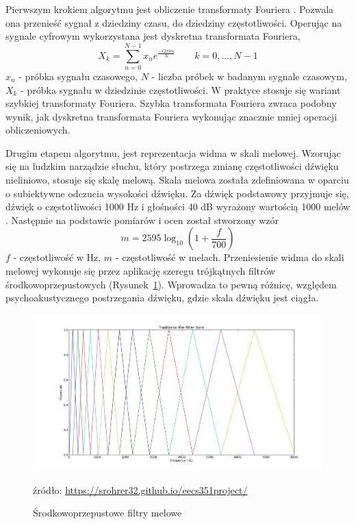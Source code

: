 \documentclass[a4paper,12pt,twoside,openany]{report}
\newcommand{\Rys}[1]{(Rysunek~\ref{#1})}
\newcommand{\zrodlo}[1]{\captionsetup{font=scriptsize}\caption*{źródło: \url{#1}}}
\begin{document}
Pierwszym krokiem algorytmu jest obliczenie transformaty Fouriera \cite{Steidl2009}. 
Pozwala ona przenieść sygnał z dziedziny czasu, do dziedziny częstotliwości. 
Operując na sygnale cyfrowym wykorzystana jest dyskretna transformata Fouriera,
\begin{equation}
	X_{k}=\sum _{n=0}^{N-1}x_{n}e^{\frac{-i2\pi kn}{N}}\qquad k=0,\dots ,N-1
\end{equation}
$x_n$ - próbka sygnału czasowego, 
$N$ - liczba próbek w badanym sygnale czasowym,
$X_k$ - próbka sygnału w dziedzinie częstotliwości.
W praktyce stosuje się wariant szybkiej transformaty Fouriera. 
Szybka transformata Fouriera zwraca podobny wynik, jak dyskretna transformata Fouriera
wykonując znacznie mniej operacji obliczeniowych.

Drugim etapem algorytmu, jest reprezentacja widma w skali melowej. 
Wzorując się na ludzkim narządzie słuchu, 
który postrzega zmianę częstotliwości dźwięku nieliniowo, stosuje się skalę melową.
Skala melowa została zdefiniowana w oparciu o subiektywne odczucia wysokości dźwięku.
Za dźwięk podstawowy przyjmuje się, dźwięk o częstotliwości 1000 Hz i głośności 40 dB wyrażony wartością 1000 melów \cite{KrishnaKishore2013}.
Następnie na podstawie pomiarów i ocen został stworzony wzór
\begin{equation}
	m=2595\log _{10}\left(1+{\frac {f}{700}}\right)
\end{equation}
$f$ - częstotliwość w Hz,
$m$ - częstotliwość w melach.
Przeniesienie widma do skali melowej wykonuje się przez aplikację szeregu trójkątnych filtrów środkowoprzepustowych \Rys{rys:mfcc:melfilterbank}. 
Wprowadza to pewną różnicę, względem psychoakustycznego postrzegania dźwięku, gdzie skala dźwięku jest ciągła.
\begin{figure}[h]
	\centering
	\includegraphics[width=\textwidth]{melfilterbank}
	\caption{Środkowoprzepustowe filtry melowe}
	\zrodlo{https://srohrer32.github.io/eecs351project/}
	\label{rys:mfcc:melfilterbank}
\end{figure}
\end{document}
